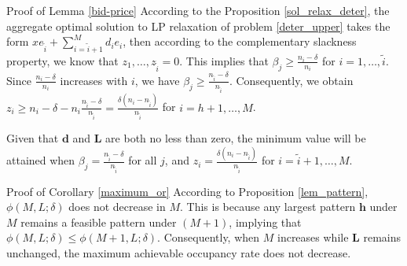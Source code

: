 \begin{pf}{Proof of Lemma \ref{bid-price}}
According to the Proposition \ref{sol_relax_deter}, the aggregate optimal solution to LP relaxation of problem \eqref{deter_upper} takes the form $x e_{\tilde{i}} + \sum_{i=\tilde{i}+1} ^{M} d_{i} e_{i}$, then according to the complementary slackness property, we know that $z_1, \ldots, z_{\tilde{i}} = 0$. This implies that $\beta_j \geq \frac{n_i - \delta}{n_i}$ for $i = 1,\ldots, \tilde{i}$. Since $\frac{n_i - \delta}{n_i}$ increases with $i$, we have $\beta_j \geq \frac{n_{\tilde{i}} - \delta}{n_{\tilde{i}}}$. Consequently, we obtain $z_{i} \geq n_i - \delta - n_i \frac{n_{\tilde{i}} - \delta}{n_{\tilde{i}}} = \frac{\delta(n_i-n_{\tilde{i}})}{n_{\tilde{i}}}$ for $i = h+1, \ldots, M$.
  
Given that $\mathbf{d}$ and $\mathbf{L}$ are both no less than zero, the minimum value will be attained when $\beta_j = \frac{n_{\tilde{i}} - \delta}{n_{\tilde{i}}}$ for all $j$, and $z_i = \frac{\delta(n_i-n_{\tilde{i}})}{n_{\tilde{i}}}$ for $i = \tilde{i}+1, \ldots, M$.  
\end{pf}

\begin{pf}{Proof of Corollary \ref{maximum_or}}
  According to Proposition \ref{lem_pattern}, $\phi(M, L; \delta)$ does not decrease in $M$. This is because any largest pattern $\bm{h}$ under $M$ remains a feasible pattern under $(M+1)$, implying that $\phi(M, L;\delta) \leq \phi(M+1, L; \delta)$. Consequently, when $M$ increases while $\bm{L}$ remains unchanged, the maximum achievable occupancy rate does not decrease. 
\end{pf}

\newpage
